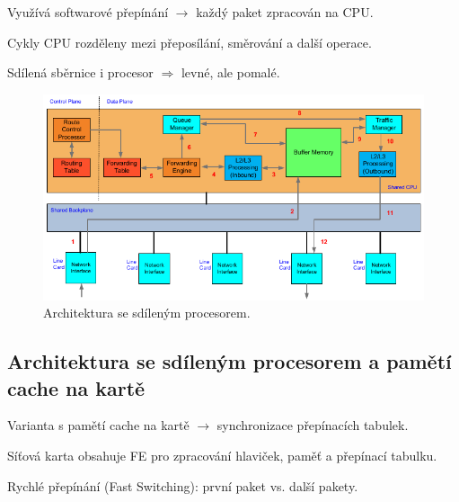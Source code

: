 \begin{compactitem}
    \item Využívá softwarové přepínání $\rightarrow$ každý paket zpracován na CPU.
    \item Cykly CPU rozděleny mezi přeposílání, směrování a další operace.
    \item Sdílená sběrnice i procesor $\Rightarrow$ levné, ale pomalé.
\end{compactitem}

\begin{figure}[H]
    \centering
    \includegraphics[width=0.95\linewidth]{architektura_se_sdilenym_procesorem.pdf}
    \caption{Architektura se sdíleným procesorem.}
\end{figure}

\subsection{Architektura se sdíleným procesorem a pamětí cache na kartě}

\begin{compactitem}
    \item Varianta s pamětí cache na kartě $\rightarrow$ synchronizace přepínacích tabulek.
    \item Síťová karta obsahuje FE pro zpracování hlaviček, paměť a přepínací tabulku.
    \item Rychlé přepínání (Fast Switching): první paket vs. další pakety.
\end{compactitem}

